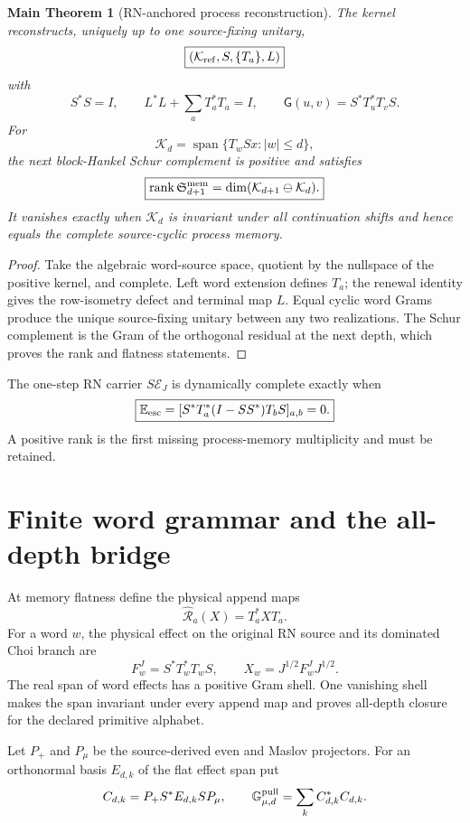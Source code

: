\documentclass[11pt,oneside,openany]{book}
\numberwithin{equation}{chapter}
\newtheorem{maintheorem}[theorem]{Main Theorem}
\theoremstyle{definition}
\theoremstyle{remark}
\newcommand{\rank}{\operatorname{rank}}
\newcommand{\Span}{\operatorname{span}}
\begin{document}
\begin{maintheorem}[RN-anchored process reconstruction]
\label{thm:v6-process-gns}
The kernel reconstructs, uniquely up to one source-fixing unitary,
\[
 \boxed{(\mathcal K_{\rm ref},S,\{T_a\},L)}
\]
with
\[
 S^*S=I,
 \qquad L^*L+\sum_aT_a^*T_a=I,
 \qquad \mathsf G(u,v)=S^*T_u^*T_vS.
\]
For
\[
 \mathcal K_d=\Span\{T_wSx:|w|\le d\},
\]
the next block-Hankel Schur complement is positive and satisfies
\[
 \boxed{\rank\mathfrak S_{d+1}^{\rm mem}
 =\dim(\mathcal K_{d+1}\ominus\mathcal K_d).}
\]
It vanishes exactly when \(\mathcal K_d\) is invariant under all continuation
shifts and hence equals the complete source-cyclic process memory.
\end{maintheorem}

\begin{proof}
Take the algebraic word-source space, quotient by the nullspace of the positive
kernel, and complete.  Left word extension defines \(T_a\); the renewal identity
gives the row-isometry defect and terminal map \(L\).  Equal cyclic word Grams
produce the unique source-fixing unitary between any two realizations.  The
Schur complement is the Gram of the orthogonal residual at the next depth,
which proves the rank and flatness statements.
\end{proof}

The one-step RN carrier \(S\mathcal E_J\) is dynamically complete exactly when
\[
 \boxed{\mathbb E_{\rm esc}
 =[S^*T_a^*(I-SS^*)T_bS]_{a,b}=0.}
\]
A positive rank is the first missing process-memory multiplicity and must be
retained.

\section{Finite word grammar and the all-depth bridge}
At memory flatness define the physical append maps
\[
 \widehat{\mathcal R}_a(X)=T_a^*XT_a.
\]
For a word \(w\), the physical effect on the original RN source and its dominated
Choi branch are
\[
 \boxed{F_w^J=S^*T_w^*T_wS,
 \qquad X_w=J^{1/2}F_w^JJ^{1/2}.}
\]
The real span of word effects has a positive Gram shell.  One vanishing shell
makes the span invariant under every append map and proves all-depth closure
for the declared primitive alphabet.

Let \(P_+\) and \(P_\mu\) be the source-derived even and Maslov projectors.  For an
orthonormal basis \(E_{d,k}\) of the flat effect span put
\[
 C_{d,k}=P_+S^*E_{d,k}SP_\mu,
 \qquad
 \mathbb G_{\mu,d}^{\rm pull}=\sum_kC_{d,k}^*C_{d,k}.
\]
\end{document}
